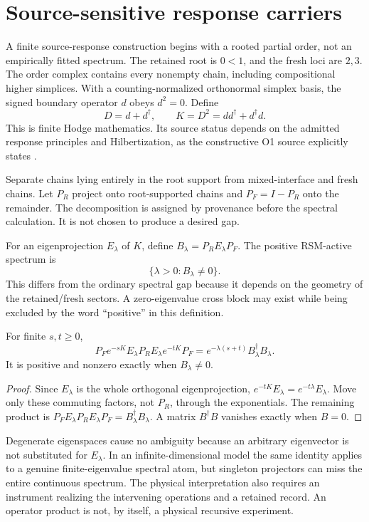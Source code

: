 \section{Source-sensitive response carriers}\label{section:o1:source-sensitive-response-carriers}
A finite source-response construction begins with a rooted partial order, not an empirically fitted spectrum. The retained root is $0<1$, and the fresh loci are $2,3$. The order complex contains every nonempty chain, including compositional higher simplices. With a counting-normalized orthonormal simplex basis, the signed boundary operator $d$ obeys $d^2=0$. Define
\[
D=d+d^\dagger,\qquad K=D^2=dd^\dagger+d^\dagger d.
\]
This is finite Hodge mathematics. Its source status depends on the admitted response principles and Hilbertization, as the constructive O1 source explicitly states \cite{RodgersO1}.

Separate chains lying entirely in the root support from mixed-interface and fresh chains. Let $P_R$ project onto root-supported chains and $P_F=I-P_R$ onto the remainder. The decomposition is assigned by provenance before the spectral calculation. It is not chosen to produce a desired gap.

For an eigenprojection $E_\lambda$ of $K$, define $B_\lambda=P_RE_\lambda P_F$. The positive RSM-active spectrum is
\[
\{\lambda>0:B_\lambda\ne0\}.
\]
This differs from the ordinary spectral gap because it depends on the geometry of the retained/fresh sectors. A zero-eigenvalue cross block may exist while being excluded by the word ``positive'' in this definition.

\begin{theorem}\label{thm:rsm}
For finite $s,t\ge0$,
\[
P_Fe^{-sK}E_\lambda P_RE_\lambda e^{-tK}P_F
=e^{-\lambda(s+t)}B_\lambda^\dagger B_\lambda.
\]
It is positive and nonzero exactly when $B_\lambda\ne0$.
\end{theorem}
\begin{proof}
Since $E_\lambda$ is the whole orthogonal eigenprojection, $e^{-tK}E_\lambda=e^{-t\lambda}E_\lambda$. Move only these commuting factors, not $P_R$, through the exponentials. The remaining product is $P_FE_\lambda P_RE_\lambda P_F=B_\lambda^\dagger B_\lambda$. A matrix $B^\dagger B$ vanishes exactly when $B=0$.
\end{proof}

Degenerate eigenspaces cause no ambiguity because an arbitrary eigenvector is not substituted for $E_\lambda$. In an infinite-dimensional model the same identity applies to a genuine finite-eigenvalue spectral atom, but singleton projectors can miss the entire continuous spectrum. The physical interpretation also requires an instrument realizing the intervening operations and a retained record. An operator product is not, by itself, a physical recursive experiment.

